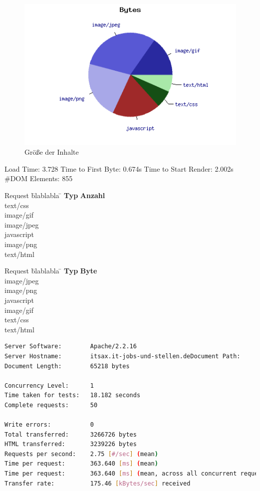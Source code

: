 \begin{figure}[htbp]
  \centering
  \includegraphics[scale=0.5]{material/start_byte_pie.png}
  \caption{Größe der Inhalte}
  \label{fig:startbyte}
\end{figure}

Load Time: 3.728
Time to First Byte: 0.674s 	
Time to Start Render: 2.002s
\#DOM Elements: 855 	

\begin{tabbing}
Request \quad\= blablabla \quad\= \kill
\textbf{Typ} 	 \> \textbf{Anzahl} \\
text/css	  	\\
image/gif	  	\\
image/jpeg	  	\\
javascript	  	\\ 
image/png	  	\\
text/html	  	\\
\end{tabbing}

\begin{tabbing}
Request \quad\= blablabla \quad\= \kill
\textbf{Typ} 	 \> \textbf{Byte} \\
image/jpeg	\\
image/png	\\
javascript	\\
image/gif	\\
text/css	\\
text/html	\\

\end{tabbing}
\begin{lstlisting}[language=bash,label=Ausgabe von ab,caption=Ausgabe von ab]
Server Software:        Apache/2.2.16
Server Hostname:        itsax.it-jobs-und-stellen.deDocument Path:          /
Document Length:        65218 bytes

Concurrency Level:      1
Time taken for tests:   18.182 seconds
Complete requests:      50

Write errors:           0
Total transferred:      3266726 bytes
HTML transferred:       3239226 bytes
Requests per second:    2.75 [#/sec] (mean)
Time per request:       363.640 [ms] (mean)
Time per request:       363.640 [ms] (mean, across all concurrent requests)
Transfer rate:          175.46 [kBytes/sec] received
\end{lstlisting}

